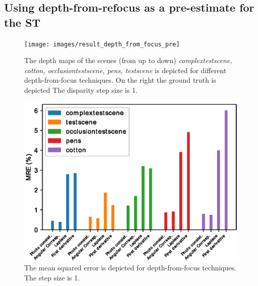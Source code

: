\documentclass  [
  paper    = a4,
  BCOR     = 10mm,
  twoside,
  fontsize = 12pt,
  fleqn,
  toc      = bibnumbered,
  toc      = listofnumbered,
  numbers  = noendperiod,
  headings = normal,
  listof   = leveldown,
  version  = 3.03
]                                       {scrreprt}
\begin{document}
	\subsection{Using depth-from-refocus as a pre-estimate for the ST}
		\begin{figure}
		\centering
		\texttt{[image: images/result\_depth\_from\_focus\_pre]}
		\caption[Depth from focus: depth maps with Resolution 1]{The depth maps of the scenes (from up to down) \textit{complextestscene, cotton, occlusiontestscene, pens, testscene} is depicted for different depth-from-focus techniques. On the right the ground truth is depicted The disparity step size is 1.}
		\label{fig:resultdepthfromfocuspre}
	\end{figure}
	\begin{figure}
	\centering
	\includegraphics[width=0.7\linewidth]{images/error_res1_all}
	\caption[Mean squared error for depth-from-focus techniques]{The mean squared error is depicted for depth-from-focus techniques. The step size is 1.}
	\label{fig:errorres1all}
	\end{figure}
\end{document}
